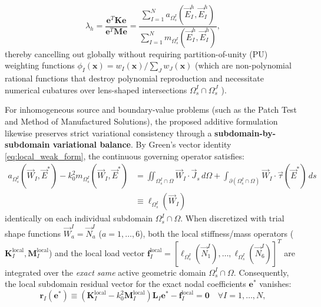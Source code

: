 \documentclass[VANCOUVER,Times1COL]{WileyNJD-v5}
\begin{document}
\begin{equation}
    \lambda_h = \frac{\mathbf{e}^T \mathbf{K} \mathbf{e}}{\mathbf{e}^T \mathbf{M} \mathbf{e}} = \frac{\sum_{I=1}^N a_{\Omega_s^I}(\vec{E}_I^h, \vec{E}_I^h)}{\sum_{I=1}^N m_{\Omega_s^I}(\vec{E}_I^h, \vec{E}_I^h)},
    \label{eq:rayleigh_quotient_overlap}
\end{equation}
thereby cancelling out globally without requiring partition-of-unity (PU) weighting functions $\phi_I(\mathbf{x}) = w_I(\mathbf{x}) / \sum_J w_J(\mathbf{x})$ (which are non-polynomial rational functions that destroy polynomial reproduction and necessitate numerical cubatures over lens-shaped intersections $\Omega_s^I \cap \Omega_s^J$ \cite{de2000method, nicomedes2021acoustic}).

For inhomogeneous source and boundary-value problems (such as the Patch Test and Method of Manufactured Solutions), the proposed additive formulation likewise preserves strict variational consistency through a \textbf{subdomain-by-subdomain variational balance}. By Green's vector identity \eqref{eq:local_weak_form}, the continuous governing operator satisfies:
\begin{equation}
    \begin{aligned}
        a_{\Omega_s^I}(\vec{W}_I, \vec{E}^*) - k_0^2 m_{\Omega_s^I}(\vec{W}_I, \vec{E}^*) & = \iint_{\Omega_s^I \cap \Omega} \vec{W}_I \cdot \vec{J}_s \, d\Omega + \int_{\partial(\Omega_s^I \cap \Omega)} \vec{W}_I \cdot \vec{\tau}(\vec{E}^*) \, ds \\
                                                                                      & \equiv \ell_{\Omega_s^I}(\vec{W}_I)
    \end{aligned}
    \label{eq:local_variational_balance}
\end{equation}
identically on each individual subdomain $\Omega_s^I \cap \Omega$. When discretized with trial shape functions $\vec{W}_a^I = \vec{N}_a^I$ ($a=1,\dots,6$), both the local stiffness/mass operators ($\mathbf{K}_I^{\mathrm{local}}, \mathbf{M}_I^{\mathrm{local}}$) and the local load vector $\mathbf{f}_I^{\mathrm{local}} = [\ell_{\Omega_s^I}(\vec{N}_1^I), \dots, \ell_{\Omega_s^I}(\vec{N}_6^I)]^T$ are integrated over the \emph{exact same} active geometric domain $\Omega_s^I \cap \Omega$. Consequently, the local subdomain residual vector for the exact nodal coefficients $\mathbf{e}^*$ vanishes:
\begin{equation}
    \mathbf{r}_I(\mathbf{e}^*) \equiv (\mathbf{K}_I^{\mathrm{local}} - k_0^2 \mathbf{M}_I^{\mathrm{local}}) \mathbf{L}_I \mathbf{e}^* - \mathbf{f}_I^{\mathrm{local}} = \mathbf{0} \quad \forall I = 1, \dots, N,
    \label{eq:subdomain_residual_zero}
\end{equation}
\end{document}
